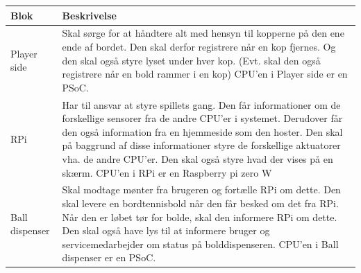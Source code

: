 \documentclass[Arkitektur/System_main.tex]{subfiles}
\begin{document}
\begin{table}[H]
\centering
\begin{tabular}{|L{0.2\columnwidth}|L{0.7\columnwidth}|}
\hline
\textbf{Blok} & \textbf{Beskrivelse} \\ \hline
Player side & Skal sørge for at håndtere alt med hensyn til kopperne på den ene ende af bordet. Den skal derfor registrere når en kop fjernes. Og den skal også styre lyset under hver kop. (Evt. skal den også registrere når en bold rammer i en kop) \newline CPU'en i Player side er en PSoC. \\ \hline
RPi & Har til ansvar at styre spillets gang. Den får informationer om de forskellige sensorer fra de andre CPU'er i systemet. Derudover får den også information fra en hjemmeside som den hoster. Den skal på baggrund af disse informationer styre de forskellige aktuatorer vha. de andre CPU'er. Den skal også styre hvad der vises på en skærm. \newline CPU'en i RPi er en Raspberry pi zero W  \\ \hline
Ball dispenser & Skal modtage mønter fra brugeren og fortælle RPi om dette. Den skal levere en bordtennisbold når den får besked om det fra RPi. Når den er løbet tør for bolde, skal den informere RPi om dette. Den skal også have lys til at informere bruger og servicemedarbejder om status på bolddispenseren. \newline CPU'en i Ball dispenser er en PSoC.  \\ \hline
\end{tabular}
\end{table}
\end{document}

